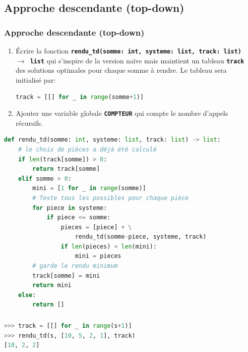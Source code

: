 \documentclass[svgnames,11pt]{beamer}
\begin{document}
\subsection{Approche descendante (top-down)}
\begin{frame}[fragile]
    \frametitle{Approche descendante (top-down)}

    \begin{activite}
    \begin{enumerate}
        \item Écrire la fonction \textbf{\texttt{rendu\_td(somme: int, systeme: list, track: list) $\rightarrow$ list}} qui s'inspire de la version naïve mais maintient un tableau \textbf{\texttt{track}} des solutions optimales pour chaque somme à rendre. Le tableau sera initialisé par:

        \begin{lstlisting}[language=Python , basicstyle=\ttfamily\small, xleftmargin=2em, xrightmargin=2em]
track = [[] for _ in range(somme+1)]
\end{lstlisting}
        \item Ajouter une variable globale \textbf{\texttt{COMPTEUR}} qui compte le nombre d'appels récursifs.
    \end{enumerate}
    \end{activite}

\end{frame}
\begin{frame}[fragile]

\begin{center}
\begin{lstlisting}[language=Python , basicstyle=\ttfamily\small, xleftmargin=0.2em, xrightmargin=-2.5em]
def rendu_td(somme: int, systeme: list, track: list) -> list:
    # le choix de pièces a déjà été calculé
    if len(track[somme]) > 0:
        return track[somme]
    elif somme > 0:
        mini = [1 for _ in range(somme)] 
        # Teste tous les possibles pour chaque pièce
        for piece in systeme:
            if piece <= somme:
                pieces = [piece] + \
                    rendu_td(somme-piece, systeme, track)
                if len(pieces) < len(mini):
                    mini = pieces
        # garde le rendu minimum
        track[somme] = mini
        return mini
    else:
        return []
\end{lstlisting}
\end{center}

\end{frame}
\begin{frame}[fragile]
    \frametitle{}

\begin{center}
\begin{lstlisting}[language=Python , basicstyle=\ttfamily\small, xleftmargin=2em, xrightmargin=2em]
>>> track = [[] for _ in range(s+1)]
>>> rendu_td(s, [10, 5, 2, 1], track)
[10, 2, 2]
\end{lstlisting}
\label{CODE}
\end{center}

\end{frame}
\end{document}
